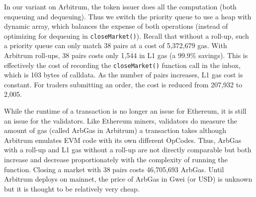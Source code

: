 %


  
In our \cm variant on Arbitrum, the token issuer does all the computation (both enqueuing and dequeuing). Thus we switch the priority queue to use a heap with dynamic array, which balances the expense of both operations (instead of optimizing for dequeuing in \texttt{closeMarket()}).  Recall that without a roll-up, such a priority queue can only match 38 pairs at a cost of 5,372,679 gas. With Arbitrum roll-ups, 38 pairs costs only 1,544 in L1 gas (a 99.9\% savings). This is effectively the cost of recording the \texttt{closeMarket()} function call in the inbox, which is 103 bytes of calldata. As the number of pairs increases, L1 gas cost is constant. For traders submitting an order, the cost is reduced from  207,932 to 2,005. 
 

 
 
While the runtime of a transaction is no longer an issue for Ethereum, it is still an issue for the validators. Like Ethereum miners, validators do measure the amount of gas (called ArbGas in Arbitrum) a transaction takes although Arbitrum emulates EVM code with its own different OpCodes. Thus, ArbGas with a roll-up and L1 gas without a roll-up are not directly comparable but both increase and decrease proportionately with the complexity of running the function. Closing a market with 38 pairs costs 46,705,693 ArbGas. Until Arbitrum deploys on mainnet, the price of ArbGas in Gwei (or USD) is unknown but it is thought to be relatively very cheap.

